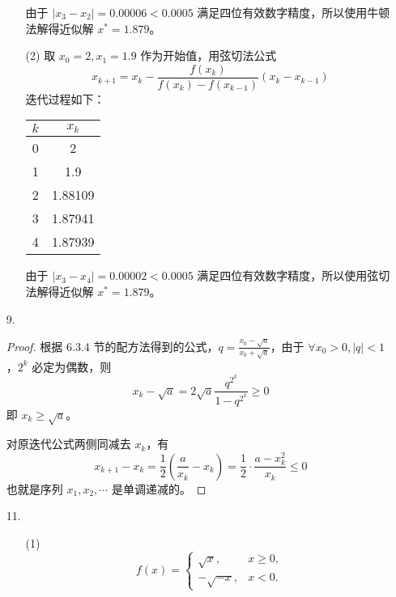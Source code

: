 \documentclass{sjtuarticle}
\begin{document}
\begin{itemize}
\begin{solution}
\begin{itemize}
            由于 $|x_3-x_2|=0.00006<0.0005$ 满足四位有效数字精度，所以使用牛顿法解得近似解 $x^*=1.879$。
            \item[(2)] 取 $x_0=2, x_1=1.9$ 作为开始值，用弦切法公式
            \begin{equation*}
                x_{k+1}=x_k-\frac{f(x_k)}{f(x_k)-f(x_{k-1})}(x_k-x_{k-1})
            \end{equation*}
            迭代过程如下：
            
            \begin{table}[H]
                \centering
                \begin{tabular}{cc}
                    \hline
                    $k$ & $x_k$ \\
                    \hline
                    0 & 2 \\
                    1 & 1.9 \\
                    2 & 1.88109 \\
                    3 & 1.87941 \\
                    4 & 1.87939 \\
                    \hline
                \end{tabular}
            \end{table}

            由于 $|x_3-x_4|=0.00002<0.0005$ 满足四位有效数字精度，所以使用弦切法解得近似解 $x^*=1.879$。
        \end{itemize}
    \end{solution}
    \item[9.] \begin{proof}
        根据 6.3.4 节的配方法得到的公式，$q=\frac{x_0-\sqrt{a}}{x_0+\sqrt{a}}$，由于 $\forall x_0>0, |q|<1$，$2^k$ 必定为偶数，则
        \begin{equation*}
            x_k-\sqrt{a}=2\sqrt{a}\frac{q^{2^k}}{1-q^{2^k}}\geq 0
        \end{equation*}
        即 $x_k\geq \sqrt{a}$。
        
        对原迭代公式两侧同减去 $x_k$，有
        \begin{equation*}
            x_{k+1}-x_k=\frac{1}{2}\left(\frac{a}{x_k}-x_k\right)=\frac{1}{2}\cdot\frac{a-x_k^2}{x_k}\leq 0
        \end{equation*}
        也就是序列 $x_1,x_2,\cdots$ 是单调递减的。
    \end{proof}
    \item[11.] \begin{solution}
        \begin{itemize}
            \item[(1)] \begin{equation*}
                f(x)=\begin{cases}
                    \sqrt{x},&x\geq 0,\\
                    -\sqrt{-x},&x<0.
                \end{cases}
            \end{equation*}


\end{itemize}
\end{solution}
\end{itemize}
\end{document}
